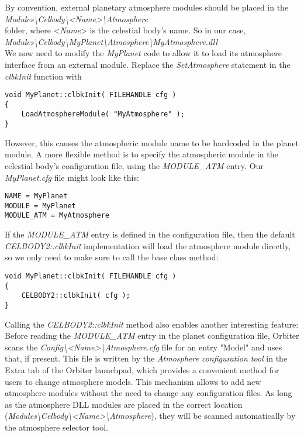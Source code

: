 \documentclass[Orbiter Developer Manual.tex]{subfiles}
\begin{document}
\noindent
By convention, external planetary atmosphere modules should be placed in the\\
\textit{Modules\textbackslash Celbody\textbackslash <Name>\textbackslash Atmosphere}\\
folder, where <\textit{Name}> is the celestial body's name. So in our case,\\
\textit{Modules\textbackslash Celbody\textbackslash MyPlanet\textbackslash Atmosphere\textbackslash MyAtmosphere.dll}\\
We now need to modify the \textit{MyPlanet} code to allow it to load its atmosphere interface from an external module. Replace the \textit{SetAtmosphere} statement in the \textit{clbkInit} function with

\begin{lstlisting}
void MyPlanet::clbkInit( FILEHANDLE cfg )
{
	LoadAtmosphereModule( "MyAtmosphere" );
}
\end{lstlisting}

\noindent
However, this causes the atmospheric module name to be hardcoded in the planet module. A more flexible method is to specify the atmospheric module in the celestial body's configuration file, using the \textit{MODULE\_ATM} entry. Our \textit{MyPlanet.cfg} file might look like this:

\begin{lstlisting}[language=OSFS]
NAME = MyPlanet
MODULE = MyPlanet
MODULE_ATM = MyAtmosphere
\end{lstlisting}

\noindent
If the \textit{MODULE\_ATM} entry is defined in the configuration file, then the default \textit{CELBODY2::clbkInit} implementation will load the atmosphere module directly, so we only need to make sure to call the base class method:

\begin{lstlisting}
void MyPlanet::clbkInit( FILEHANDLE cfg )
{
	CELBODY2::clbkInit( cfg );
}
\end{lstlisting}

\noindent
Calling the \textit{CELBODY2::clbkInit} method also enables another interesting feature: Before reading the \textit{MODULE\_ATM} entry in the planet configuration file, Orbiter scans the \textit{Config\textbackslash <Name>\textbackslash Atmosphere.cfg} file for an entry "Model" and uses that, if present. This file is written by the \textit{Atmosphere configuration tool} in the Extra tab of the Orbiter launchpad, which provides a convenient method for users to change atmosphere models. This mechanism allows to add new atmosphere modules without the need to change any configuration files. As long as the atmosphere DLL modules are placed in the correct location (\textit{Modules\textbackslash Celbody\textbackslash <Name>\textbackslash Atmosphere}), they will be scanned automatically by the atmosphere selector tool.
\end{document}
